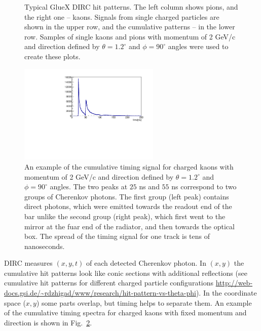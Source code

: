 \begin{figure}[!h]
\caption{\label{pic:hitpat1}
Typical GlueX DIRC hit patterns. The left column shows pions, and the right one -- kaons. 
Signals from single charged particles are shown in the upper row, and the cumulative patterns -- in the lower row.
Samples of single kaons and pions with momentum of 2 GeV/c and direction defined by $\theta = 1.2^{\circ}$ and $\phi = 90^{\circ}$ angles were used to create these plots.
}
\end{figure}

\begin{figure}[!h]
\centering
\includegraphics[angle=0,width=0.6\textwidth]{pics/Npho_th1_2_ph90.pdf}
\caption{\label{pic:time}
An example of the cumulative timing signal for charged kaons with momentum of 2 GeV/c and direction defined by $\theta = 1.2^{\circ}$ and $\phi = 90^{\circ}$ angles. The two peaks at $25$ ns and $55$ ns correspond to two groups of Cherenkov photons. The first group (left peak) contains direct photons, which were emitted towards the readout end of the bar unlike the second group (right peak), which first went to the mirror at the fuar end of the radiator, and then towards the optical box. The spread of the timing signal for one track is tens of nanoseconds. 
}
\end{figure}

DIRC measures $(x,y,t)$ of each detected Cherenkov photon. In $(x,y)$ the cumulative hit patterns look like conic sections with additional reflections (see cumulative hit patterns for different charged particle configurations \url{http://web-docs.gsi.de/~rdzhigad/www/research/hit-pattern-vs-theta-phi}). In the coordinate space ($x ,y$) some parts overlap, but timing helps to separate them.
An example of the cumulative timing spectra for charged kaons with fixed momentum and direction is shown in Fig.~\ref{pic:time}. 

